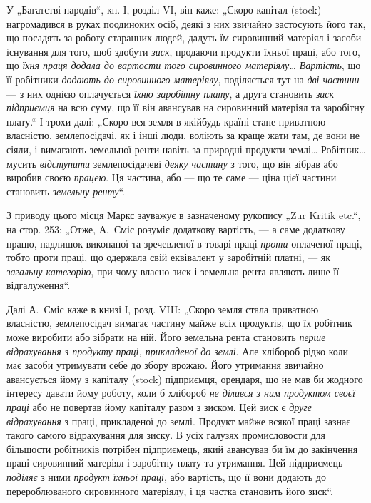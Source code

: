 У „Багатстві народів“, кн. І, розділ VI, він каже: „Скоро капітал
(stock) нагромадився в руках поодиноких осіб, деякі з них звичайно застосують
його так, що посадять за роботу старанних людей, дадуть їм
сировинний матеріял і засоби існування для того, щоб здобути \emph{зиск},
продаючи продукти їхньої праці, або того, що \emph{їхня праця додала до
вартости того сировинного матеріялу\dots{} Вартість}, що її робітники
\emph{додають до сировинного матеріялу}, поділяється тут на \emph{дві частини} —
з них однією оплачується \emph{їхню заробітну плату}, а друга становить
\emph{зиск підприємця} на всю суму, що її він авансував на сировинний
матеріял та заробітну плату.“ І трохи далі: „Скоро вся земля в якійбудь
країні стане приватною власністю, землепосідачі, як і інші люди,
воліють за краще жати там, де вони не сіяли, і вимагають земельної
ренти навіть за природні продукти землі\dots{} Робітник\dots{} мусить \emph{відступити}
землепосідачеві \emph{деяку частину} з того, що він зібрав або виробив
своєю \emph{працею}. Ця частина, або — що те саме — ціна цієї частини становить
\emph{земельну ренту}“.

З приводу цього місця Маркс зауважує в зазначеному рукопису
„Zur Kritik etc.“, на стор. 253: „Отже, А.~Сміс розуміє додаткову вартість,
— а саме додаткову працю, надлишок виконаної та зречевленої в
товарі праці \emph{проти} оплаченої праці, тобто проти праці, що одержала
свій еквівалент у заробітній платні, — як \emph{загальну категорію}, при чому
власно зиск і земельна рента являють лише її відгалуження“.

Далі А.~Сміс каже в книзі І, розд. VIII: „Скоро земля стала приватною
власністю, землепосідач вимагає частину майже всіх продуктів, що
їх робітник може виробити або зібрати на ній. Його земельна рента
становить \emph{перше відрахування з продукту праці, прикладеної до землі}.
Але хлібороб рідко коли має засоби утримувати себе до збору врожаю.
Його утримання звичайно авансується йому з капіталу (stock) підприємця,
орендаря, що не мав би жодного інтересу давати йому роботу, коли б
хлібороб \emph{не ділився з ним продуктом своєї праці} або не повертав йому
капіталу разом з зиском. Цей зиск є \emph{друге відрахування} з праці, прикладеної
до землі. Продукт майже всякої праці зазнає такого самого
відрахування для зиску. В усіх галузях промисловости для більшости робітників
потрібен підприємець, який авансував би їм до закінчення праці
сировинний матеріял і заробітну плату та утримання. Цей підприємець
\emph{поділяє} з ними \emph{продукт їхньої праці}, або вартість, що її вони додають
до перероблюваного сировинного матеріялу, і ця частка становить його
зиск“.


